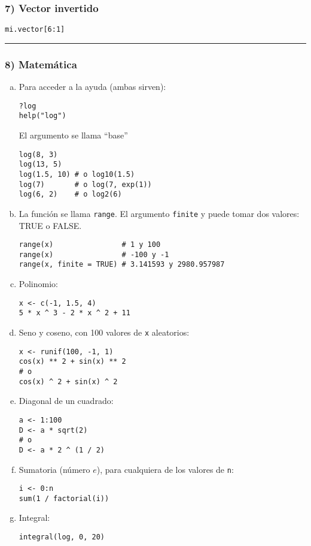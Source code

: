 \documentclass[]{article}
\begin{document}
\subsubsection{7) Vector invertido}

\begin{verbatim}
mi.vector[6:1]
\end{verbatim}
\begin{center}\rule{3in}{0.4pt}\end{center}

\subsubsection{8) Matemática}

\begin{enumerate}[a.]
\item
  Para acceder a la ayuda (ambas sirven):

\begin{verbatim}
?log
help("log")
\end{verbatim}
  El argumento se llama ``base''

\begin{verbatim}
log(8, 3)
log(13, 5)
log(1.5, 10) # o log10(1.5)
log(7)       # o log(7, exp(1))
log(6, 2)    # o log2(6)
\end{verbatim}
\item
  La función se llama \texttt{range}. El argumento \texttt{finite} y
  puede tomar dos valores: TRUE o FALSE.

\begin{verbatim}
range(x)                # 1 y 100
range(x)                # -100 y -1
range(x, finite = TRUE) # 3.141593 y 2980.957987
\end{verbatim}
\item
  Polinomio:

\begin{verbatim}
x <- c(-1, 1.5, 4)
5 * x ^ 3 - 2 * x ^ 2 + 11
\end{verbatim}
\item
  Seno y coseno, con 100 valores de \texttt{x} aleatorios:

\begin{verbatim}
x <- runif(100, -1, 1)
cos(x) ** 2 + sin(x) ** 2
# o
cos(x) ^ 2 + sin(x) ^ 2
\end{verbatim}
\item
  Diagonal de un cuadrado:

\begin{verbatim}
a <- 1:100
D <- a * sqrt(2)
# o
D <- a * 2 ^ (1 / 2)
\end{verbatim}
\item
  Sumatoria (número $e$), para cualquiera de los valores de \texttt{n}:

\begin{verbatim}
i <- 0:n
sum(1 / factorial(i))
\end{verbatim}
\item
  Integral:

\begin{verbatim}
integral(log, 0, 20)
\end{verbatim}
\end{enumerate}
\end{document}
